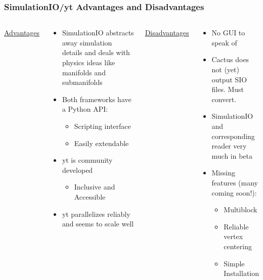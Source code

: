 \documentclass[]{beamer}
\begin{document}
\begin{frame}
  \frametitle{SimulationIO/yt Advantages and Disadvantages}
  \begin{columns}
    \column{6cm}
    \underline{\color{green}\huge Advantages}
    \begin{large}
      \begin{itemize}
      \item SimulationIO abstracts away simulation details and deals with physics ideas like manifolds and submanifolds
      \item Both frameworks have a Python API:
        \begin{itemize}
        \item Scripting interface
        \item Easily extendable
        \end{itemize}
      \item yt is community developed
        \begin{itemize}
        \item Inclusive and Accessible
        \end{itemize}
      \item yt parallelizes reliably and seems to scale well
      \end{itemize}
    \end{large}
    \column{6cm}
    \underline{\color{red}\huge Disadvantages}
    \begin{large}
      \begin{itemize}
      \item No GUI to speak of
      \item Cactus does not (yet) output SIO files. Must convert.
      \item SimulationIO and corresponding reader very much in beta
      \item Missing features (many coming soon!):
        \begin{itemize}
        \item Multiblock
        \item Reliable vertex centering
        \item Simple Installation
        \end{itemize}
      \end{itemize}
    \end{large}
  \end{columns}
\end{frame}
\end{document}

